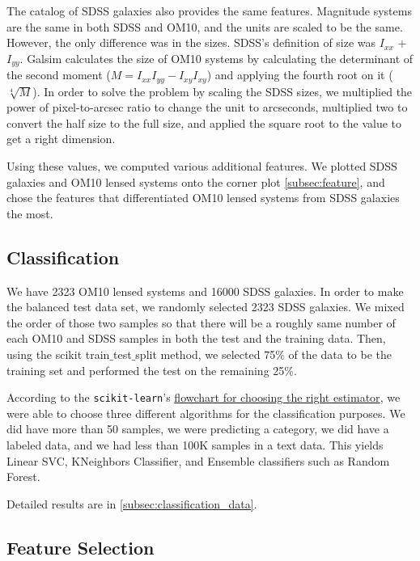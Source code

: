 \documentclass[\docopts]{\docclass}
\begin{document}
The catalog of SDSS galaxies also provides the same features. Magnitude
systems are the same in both SDSS and OM10, and the units are scaled to
be the same. However, the only difference was in the sizes. SDSS's
definition of size was $I_{xx}$ + $I_{yy}$. Galsim calculates the size
of OM10 systems by calculating the determinant of the second moment
($M=I_{xx}I_{yy}-I_{xy}I_{xy}$) and applying the fourth root on it
($\sqrt[4]{M}$). In order to solve the problem by scaling the SDSS
sizes, we multiplied the power of pixel-to-arcsec ratio to change the
unit to arcseconds, multiplied two to convert the half size to the full
size, and applied the square root to the value to get a right dimension.

Using these values, we computed various additional features. We plotted
SDSS galaxies and OM10 lensed systems onto the corner plot
\autoref{subsec:feature}, and chose the features that differentiated
OM10 lensed systems from SDSS galaxies the most.

\subsection{Classification}
\label{subsec:classification}

We have 2323 OM10 lensed systems and 16000 SDSS galaxies. In order to
make the balanced test data set, we randomly selected 2323 SDSS
galaxies. We mixed the order of those two samples so that there will be
a roughly same number of each OM10 and SDSS samples in both the test and
the training data. Then, using the scikit train$\_$test$\_$split method,
we selected 75$\%$ of the data to be the training set and performed the
test on the remaining 25$\%$.

According to the \texttt{scikit-learn}'s
\href{http://scikit-learn.org/stable/tutorial/machine_learning_map/index.html}
{flowchart for choosing the right estimator}, we were able to choose
three different algorithms for the classification purposes. We did have
more than 50 samples, we were predicting a category, we did have a
labeled data, and we had less than 100K samples in a text data. This
yields Linear SVC, KNeighbors Classifier, and Ensemble classifiers such
as Random Forest.

Detailed results are in \autoref{subsec:classification_data}.









\subsection{Feature Selection}
\label{subsec:feature_data}
\end{document}
